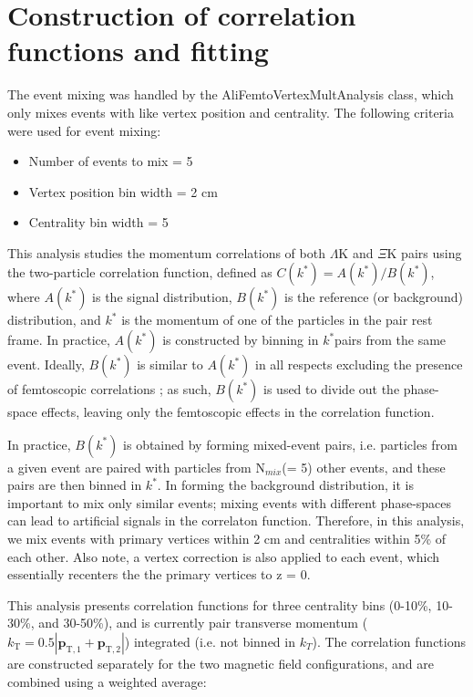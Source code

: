 \documentclass[ALICE,manyauthors]{cernphprep}
\newcommand{\LamK}{$\Lambda$K\xspace}
\newcommand{\kst}{$k^{*}$}
\begin{document}
\section{Construction of correlation functions and fitting}
\label{sec:CfConstructionAndFitting}
The event mixing was handled by the AliFemtoVertexMultAnalysis class, which only mixes events with like vertex position and centrality.
The following criteria were used for event mixing:

\begin{itemize}
 \itemsep0em
 \item Number of events to mix = 5
 \item Vertex position bin width = 2 cm
 \item Centrality bin width = 5%
\end{itemize}



This analysis studies the momentum correlations of both \LamK and $\Xi$K pairs using the two-particle correlation function, defined as $C(k^{*}) = A(k^{*})/B(k^{*})$, where $A(k^{*})$ is the signal distribution, $B(k^{*})$ is the reference (or background) distribution, and $k^{*}$ is the momentum of one of the particles in the pair rest frame.
In practice, $A(k^{*})$ is constructed by binning in \kst pairs from the same event.
Ideally, $B(k^{*})$ is similar to $A(k^{*})$ in all respects excluding the presence of femtoscopic correlations \cite{Lisa:2005dd}; as such, $B(k^{*})$ is used to divide out the phase-space effects, leaving only the femtoscopic effects in the correlation function. 

In practice, $B(k^{*})$ is obtained by forming mixed-event pairs, i.e. particles from a given event are paired with particles from N$_{mix}$(= 5) other events, and these pairs are then binned in \kst.
In forming the background distribution, it is important to mix only similar events; mixing events with different phase-spaces can lead to artificial signals in the correlaton function.
Therefore, in this analysis, we mix events with primary vertices within 2 cm and centralities within 5\% of each other.
Also note, a vertex correction is also applied to each event, which essentially recenters the the primary vertices to z = 0.

This analysis presents correlation functions for three centrality bins (0-10\%, 10-30\%, and 30-50\%), and is currently pair transverse momentum ($k_{\mathrm{T}} = 0.5|\mathbf{p}_{\mathrm{T,1}}+\mathbf{p}_{\mathrm{T,2}}|$) integrated (i.e. not binned in $k_{T}$).  
The correlation functions are constructed separately for the two magnetic field configurations, and are combined using a weighted average:
\end{document}
